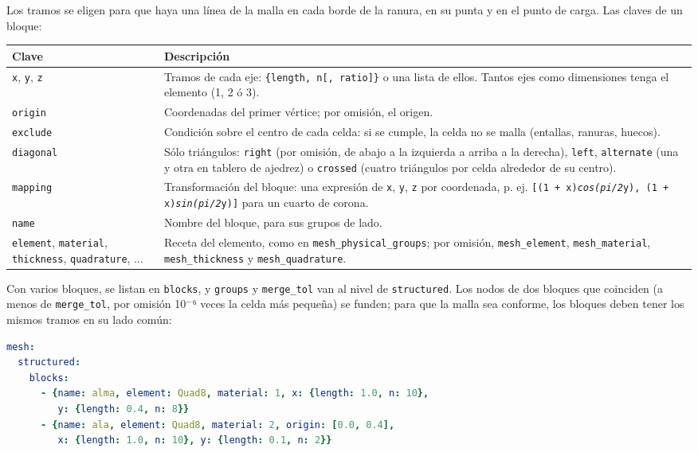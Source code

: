 \documentclass[11pt,oneside]{report}
\begin{document}
Los tramos se eligen para que haya una línea de la malla en cada borde de la ranura, en su punta y en el punto de carga. Las claves de un bloque:

\begin{center}
\begin{tabularx}{\textwidth}{YY}
\hline
\textbf{Clave} & \textbf{Descripción} \\
\hline
\texttt{x}, \texttt{y}, \texttt{z} & Tramos de cada eje: \texttt{\{length, n[, ratio]\}} o una lista de ellos. Tantos ejes como dimensiones tenga el elemento (1, 2 ó 3). \\
\texttt{origin} & Coordenadas del primer vértice; por omisión, el origen. \\
\texttt{exclude} & Condición sobre el centro de cada celda: si se cumple, la celda no se malla (entallas, ranuras, huecos). \\
\texttt{diagonal} & Sólo triángulos: \texttt{right} (por omisión, de abajo a la izquierda a arriba a la derecha), \texttt{left}, \texttt{alternate} (una y otra en tablero de ajedrez) o \texttt{crossed} (cuatro triángulos por celda alrededor de su centro). \\
\texttt{mapping} & Transformación del bloque: una expresión de \texttt{x}, \texttt{y}, \texttt{z} por coordenada, p. ej. \texttt{[\textquotedbl{}(1 + x)\textit{cos(pi/\allowbreak{}2}y)\textquotedbl{}, \textquotedbl{}(1 + x)\textit{sin(pi/\allowbreak{}2}y)\textquotedbl{}]} para un cuarto de corona. \\
\texttt{name} & Nombre del bloque, para sus grupos de lado. \\
\texttt{element}, \texttt{material}, \texttt{thickness}, \texttt{quadrature}, ... & Receta del elemento, como en \texttt{mesh\_\allowbreak{}physical\_\allowbreak{}groups}; por omisión, \texttt{mesh\_element}, \texttt{mesh\_material}, \texttt{mesh\_thickness} y \texttt{mesh\_quadrature}. \\
\hline
\end{tabularx}
\end{center}
Con varios bloques, se listan en \texttt{blocks}, y \texttt{groups} y \texttt{merge\_tol} van al nivel de \texttt{structured}. Los nodos de dos bloques que coinciden (a menos de \texttt{merge\_tol}, por omisión 10\ensuremath{^{-}}⁶ veces la celda más pequeña) se funden; para que la malla sea conforme, los bloques deben tener los mismos tramos en su lado común:

\begin{lstlisting}[language=yaml]
mesh:
  structured:
    blocks:
      - {name: alma, element: Quad8, material: 1, x: {length: 1.0, n: 10},
         y: {length: 0.4, n: 8}}
      - {name: ala, element: Quad8, material: 2, origin: [0.0, 0.4],
         x: {length: 1.0, n: 10}, y: {length: 0.1, n: 2}}

\end{lstlisting}
\end{document}
